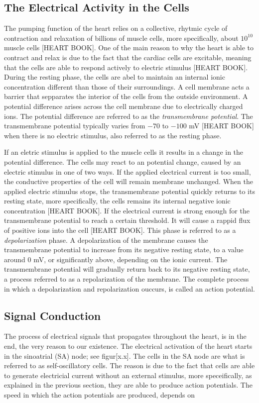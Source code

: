 \subsection{The Electrical Activity in the Cells}
The pumping function of the heart relies on a collective, rhytmic cycle of contraction and relaxation of billions of muscle cells, more specifically, about \(10^{10}\) muscle cells [HEART BOOK]. One of the main reason to why the heart is able to contract and relax is due to the fact that the cardiac cells are excitable, meaning that the cells are able to respond actively to electric stimulus [HEART BOOK]. During the resting phase, the cells are abel to maintain an internal ionic concentration different than those of their surroundings. A cell membrane acts a barrier that sepparates the interior of the cells from the outside environment. A potential difference arises across the cell membrane due to electrically charged ions. The potential difference are referred to as the \textit{transmembrane potential}. The transmembrane potential typically varies from \(-70\) to \(-100\) mV [HEART BOOK] when there is no electric stimulus, also referred to as the resting phase. 

If an eletric stimulus is applied to the muscle cells it results in a change in the potential difference. The cells may react to an potential change, caused by an electric stimulus in one of two ways. If the applied electrical current is too small, the conductive properties of the cell will remain membrane unchanged. When the applied electric stimulus stops, the transmembrane potential quickly returns to its resting state, more specifically, the cells remains its internal negative ionic concentration [HEART BOOK]. If the electrical current is strong enough for the transmembrane potential to reach a certain threshold. It will cause a rappid flux of positive ions into the cell [HEART BOOK]. This phase is referred to as a \textit{depolarization} phase. A depolarization of the membrane causes the transmembrane potential to increase from its negative resting state, to a value around \(0\) mV, or significantly above, depending on the ionic current. The transmembrane potential will gradually return back to its negative resting state, a process referred to as a repolarization of the membrane. The complete process in which a depolarization and repolarization ouccurs, is called an action potential. 

\subsection{Signal Conduction}
The process of electrical signals that propagates throughout the heart, is in the end, the very reason to our existence. The electrical activation of the heart starts in the sinoatrial (SA) node; see figur[x.x]. The cells in the SA node are what is referred to as self-oscillatory cells. The reason is due to the fact that cells are able to generate electricial current without an external stimulus, more speceifically, as explained in the previous section, they are able to produce action potentials. The speed in which the action potentials are produced, depends on

